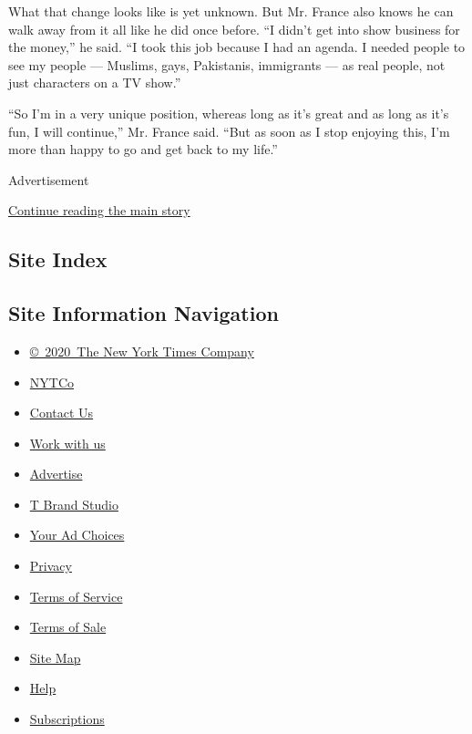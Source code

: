 What that change looks like is yet unknown. But Mr. France also knows he
can walk away from it all like he did once before. ``I didn't get into
show business for the money,'' he said. ``I took this job because I had
an agenda. I needed people to see my people --- Muslims, gays,
Pakistanis, immigrants --- as real people, not just characters on a TV
show.''

``So I'm in a very unique position, whereas long as it's great and as
long as it's fun, I will continue,'' Mr. France said. ``But as soon as I
stop enjoying this, I'm more than happy to go and get back to my life.''

Advertisement

\protect\hyperlink{after-bottom}{Continue reading the main story}

\hypertarget{site-index}{%
\subsection{Site Index}\label{site-index}}

\hypertarget{site-information-navigation}{%
\subsection{Site Information
Navigation}\label{site-information-navigation}}

\begin{itemize}
\tightlist
\item
  \href{https://help.nytimes3xbfgragh.onion/hc/en-us/articles/115014792127-Copyright-notice}{©~2020~The
  New York Times Company}
\end{itemize}

\begin{itemize}
\tightlist
\item
  \href{https://www.nytco.com/}{NYTCo}
\item
  \href{https://help.nytimes3xbfgragh.onion/hc/en-us/articles/115015385887-Contact-Us}{Contact
  Us}
\item
  \href{https://www.nytco.com/careers/}{Work with us}
\item
  \href{https://nytmediakit.com/}{Advertise}
\item
  \href{http://www.tbrandstudio.com/}{T Brand Studio}
\item
  \href{https://www.nytimes3xbfgragh.onion/privacy/cookie-policy\#how-do-i-manage-trackers}{Your
  Ad Choices}
\item
  \href{https://www.nytimes3xbfgragh.onion/privacy}{Privacy}
\item
  \href{https://help.nytimes3xbfgragh.onion/hc/en-us/articles/115014893428-Terms-of-service}{Terms
  of Service}
\item
  \href{https://help.nytimes3xbfgragh.onion/hc/en-us/articles/115014893968-Terms-of-sale}{Terms
  of Sale}
\item
  \href{https://spiderbites.nytimes3xbfgragh.onion}{Site Map}
\item
  \href{https://help.nytimes3xbfgragh.onion/hc/en-us}{Help}
\item
  \href{https://www.nytimes3xbfgragh.onion/subscription?campaignId=37WXW}{Subscriptions}
\end{itemize}
